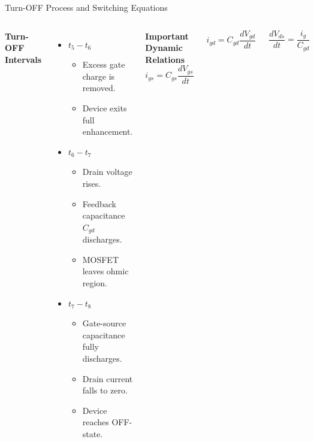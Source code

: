 \begin{frame}{Turn-OFF Process and Switching Equations}
\begin{columns}[T]
\textbf{Turn-OFF Intervals}
\begin{itemize}
    \item \textbf{$t_5 - t_6$}
    \begin{itemize}
        \item Excess gate charge is removed.
        \item Device exits full enhancement.
    \end{itemize}
    
    \item \textbf{$t_6 - t_7$}
    \begin{itemize}
        \item Drain voltage rises.
        \item Feedback capacitance $C_{gd}$ discharges.
        \item MOSFET leaves ohmic region.
    \end{itemize}
    
    \item \textbf{$t_7 - t_8$}
    \begin{itemize}
        \item Gate-source capacitance fully discharges.
        \item Drain current falls to zero.
        \item Device reaches OFF-state.
    \end{itemize}
\end{itemize}

\textbf{Important Dynamic Relations}
\[
i_{gs} = C_{gs}\frac{dV_{gs}}{dt}
\]

\[
i_{gd} = C_{gd}\frac{dV_{gd}}{dt}
\]

\[
\frac{dV_{ds}}{dt} = \frac{i_g}{C_{gd}}
\]

\end{columns}
\end{frame}



